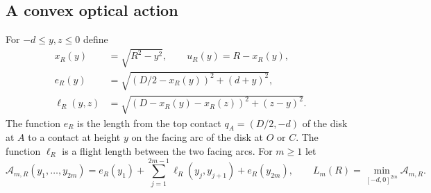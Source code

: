 \subsection{A convex optical action}
For $-d\le y,z\le0$ define
\begin{align}
 x_R(y)&=\sqrt{R^2-y^2},\qquad u_R(y)=R-x_R(y),\nonumber\\
 e_R(y)&=\sqrt{(D/2-x_R(y))^2+(d+y)^2},\label{eq:excursion-lengths}\\
 \ell_R(y,z)&=\sqrt{(D-x_R(y)-x_R(z))^2+(z-y)^2}.\nonumber
\end{align}
The function $e_R$ is the length from the top contact
$q_A=(D/2,-d)$ of the disk at $A$ to a contact at height $y$ on the
facing arc of the disk at $O$ or $C$. The function $\ell_R$ is a
flight length between the two facing arcs. For $m\ge1$ let
\begin{equation}\label{eq:excursion-action}
 \mathcal A_{m,R}(y_1,\ldots,y_{2m})
 =e_R(y_1)+\sum_{j=1}^{2m-1}\ell_R(y_j,y_{j+1})+e_R(y_{2m}),
 \qquad L_m(R)=\min_{[-d,0]^{2m}}\mathcal A_{m,R}.
\end{equation}

